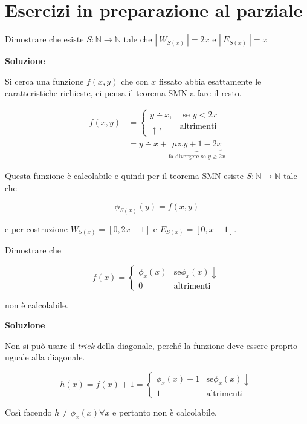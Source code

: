 
\chapter{Esercizi in preparazione al parziale}

Dimostrare che esiste $ S : \mathbb{N} \rightarrow \mathbb{N}$ tale che $|\: W_{S(x)}\:|  = 2 x$ e $ |\: E_{S(x)}\:| =x $

\textbf{Soluzione}

Si cerca una funzione $ f(x,y) $ che con $ x $ fissato abbia esattamente le caratteristiche richieste, ci pensa il teorema SMN a fare il resto.

\begin{align*}
f(x,y) &= \begin{cases}
y \dotminus x, &\text{ se } y < 2x \\
\uparrow, &\text{altrimenti}
\end{cases} \\
 &= y\dotminus x + \underbrace{\mu z. y +1 -2x}_{\text{fa divergere se } y \geq 2x}
\end{align*}

Questa funzione è calcolabile e quindi per il teorema SMN esiste $ S : \mathbb{N} \rightarrow \mathbb{N} $ tale che 

$$
\phi_{S(x)}(y) = f(x,y)
$$

e per costruzione $W_{S(x)} = [0,2x-1]$ e $ E_{S(x)} = [0,x-1] $.

Dimostrare che 

$$
f(x) = \begin{cases}
\phi_x(x) &\text{se} \phi_x(x)\downarrow \\
0 &\text{altrimenti}
\end{cases}
$$

non è calcolabile.

\textbf{Soluzione}

Non si può usare il \textit{trick} della diagonale, perché la funzione deve essere proprio uguale alla diagonale.

$$ h(x) = f(x)+1 = \begin{cases}
\phi_x(x)  + 1 &\text{se} \phi_x(x)\downarrow \\
1 &\text{altrimenti}
\end{cases}
 $$

Così facendo $ h \neq \phi_x(x) \forall x $ e pertanto non è calcolabile.

